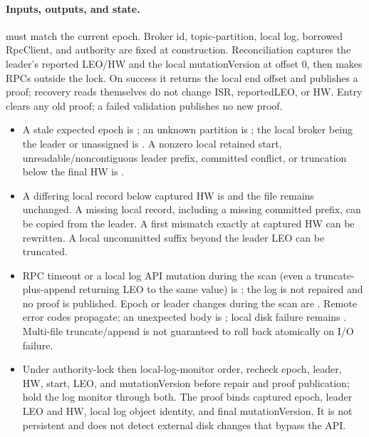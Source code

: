 \paragraph{Inputs, outputs, and state.} must match the current epoch. Broker id, topic-partition, local log, borrowed RpcClient, and authority are fixed at construction. Reconciliation captures the leader's reported LEO/HW and the local mutationVersion at offset 0, then makes RPCs outside the lock. On success it returns the local end offset and publishes a proof; recovery reads themselves do not change ISR, reportedLEO, or HW. Entry clears any old proof; a failed validation publishes no new proof.
\begin{itemize}
\item A stale expected epoch is ; an unknown partition is ; the local broker being the leader or unassigned is . A nonzero local retained start, unreadable/noncontiguous leader prefix, committed conflict, or truncation below the final HW is .
\item A differing local record below captured HW is  and the file remains unchanged. A missing local record, including a missing committed prefix, can be copied from the leader. A first mismatch exactly at captured HW can be rewritten. A local uncommitted suffix beyond the leader LEO can be truncated.
\item RPC timeout or a local log API mutation during the scan (even a truncate-plus-append returning LEO to the same value) is ; the log is not repaired and no proof is published. Epoch or leader changes during the scan are . Remote error codes propagate; an unexpected body is ; local disk failure remains . Multi-file truncate/append is not guaranteed to roll back atomically on I/O failure.
\item Under authority-lock then local-log-monitor order, recheck epoch, leader, HW, start, LEO, and mutationVersion before repair and proof publication; hold the log monitor through both. The proof binds captured epoch, leader LEO and HW, local log object identity, and final mutationVersion. It is not persistent and does not detect external disk changes that bypass the API.
\end{itemize}
